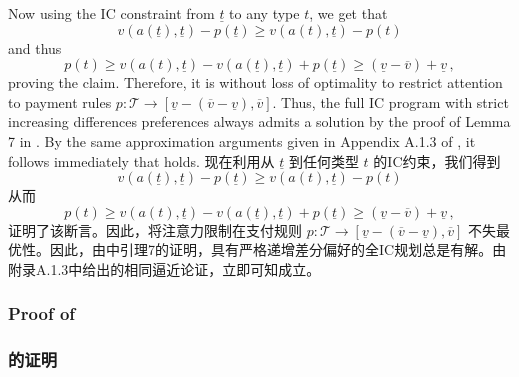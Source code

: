 \documentclass[12pt,letterpaper]{article}
\newenvironment{original}{\color{black}\noindent}{}
\newenvironment{translation}{\color{blue}\noindent}{}
\theoremstyle{plain}
\theoremstyle{definition}
\theoremstyle{remark}
\renewcommand{\1}{\mathds{1}}
\theoremstyle{definition}
\begin{document}
\begin{original}
Now using the IC constraint from $\underline{t}$ to any type $t$, we get that
\[v(a(\underline{t}), \underline{t}) - p(\underline{t}) \geq v(a(t), \underline{t}) - p(t)\]
and thus
\[p(t) \geq v(a(t), \underline{t}) - v(a(\underline{t}), \underline{t}) + p(\underline{t}) \geq (\underline{v} - \overline{v}) + \underline{v}\,,\]
proving the claim. Therefore, it is without loss of optimality to restrict attention to payment rules $p: \mathcal{T} \rightarrow [\underline{v} - (\overline{v} - \underline{v}), \overline{v}]$. Thus, the full IC program with strict increasing differences preferences always admits a solution by the proof of Lemma 7 in \citet{yang2022costly}. By the same approximation arguments given in Appendix A.1.3 of \citet{yang2022costly}, it follows immediately that  holds.
\end{original}
\begin{translation}
现在利用从 $\underline{t}$ 到任何类型 $t$ 的IC约束，我们得到
\[v(a(\underline{t}), \underline{t}) - p(\underline{t}) \geq v(a(t), \underline{t}) - p(t)\]
从而
\[p(t) \geq v(a(t), \underline{t}) - v(a(\underline{t}), \underline{t}) + p(\underline{t}) \geq (\underline{v} - \overline{v}) + \underline{v}\,,\]
证明了该断言。因此，将注意力限制在支付规则 $p: \mathcal{T} \rightarrow [\underline{v} - (\overline{v} - \underline{v}), \overline{v}]$ 不失最优性。因此，由\citet{yang2022costly}中引理7的证明，具有严格递增差分偏好的全IC规划总是有解。由\citet{yang2022costly}附录A.1.3中给出的相同逼近论证，立即可知成立。
\end{translation}

\begin{original}
\subsubsection{Proof of }\label{subsec:lottery}
\end{original}
\begin{translation}
\subsubsection{的证明}\label{subsec:lottery}
\end{translation}
\end{document}
